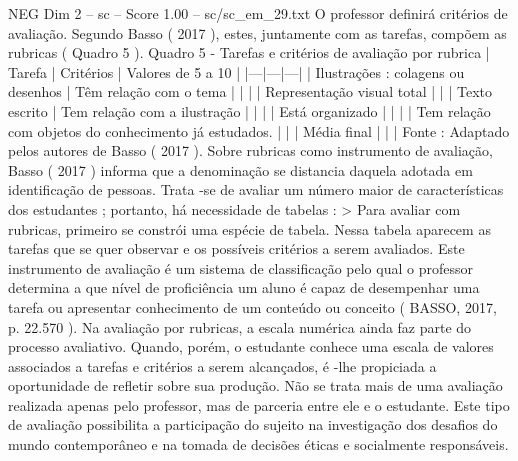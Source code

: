 \begin{textsample}{NEG Dim 2 – sc – Score 1.00 – sc/sc\_em\_29.txt}
O professor definirá critérios de avaliação.
Segundo Basso ( 2017 ), estes, juntamente com as tarefas, compõem as rubricas ( Quadro 5 ).
Quadro 5 - Tarefas e critérios de avaliação por rubrica | Tarefa | Critérios | Valores de 5 a 10 | |---|---|---| | Ilustrações : colagens ou desenhos | Têm relação com o tema | | | | Representação visual total | | | Texto escrito | Tem relação com a ilustração | | | | Está organizado | | | | Tem relação com objetos do conhecimento já estudados. | | | Média final | | | Fonte : Adaptado pelos autores de Basso ( 2017 ).
Sobre rubricas como instrumento de avaliação, Basso ( 2017 ) informa que a denominação se distancia daquela adotada em identificação de pessoas.
Trata -se de avaliar um número maior de características dos estudantes ; portanto, há necessidade de tabelas : > Para avaliar com rubricas, primeiro se constrói uma espécie de tabela.
Nessa tabela aparecem as tarefas que se quer observar e os possíveis critérios a serem avaliados.
Este instrumento de avaliação é um sistema de classificação pelo qual o professor determina a que nível de proficiência um aluno é capaz de desempenhar uma tarefa ou apresentar conhecimento de um conteúdo ou conceito ( BASSO, 2017, p. 22.570 ).
Na avaliação por rubricas, a escala numérica ainda faz parte do processo avaliativo.
Quando, porém, o estudante conhece uma escala de valores associados a tarefas e critérios a serem alcançados, é -lhe propiciada a oportunidade de refletir sobre sua produção.
Não se trata mais de uma avaliação realizada apenas pelo professor, mas de parceria entre ele e o estudante.
Este tipo de avaliação possibilita a participação do sujeito na investigação dos desafios do mundo contemporâneo e na tomada de decisões éticas e socialmente responsáveis.

\end{textsample}
